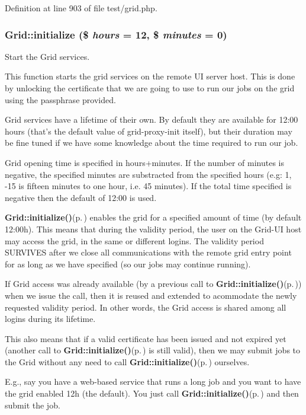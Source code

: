 Definition at line 903 of file test/grid.php.
\subsubsection{\setlength{\rightskip}{0pt plus 5cm}Grid::initialize (\$ {\em hours} = 12, \$ {\em minutes} = 0)}\label{classGrid_a11}


Start the Grid services. 

This function starts the grid services on the remote UI server host. This is done by unlocking the certificate that we are going to use to run our jobs on the grid using the passphrase provided.

Grid services have a lifetime of their own. By default they are available for 12:00 hours (that's the default value of grid-proxy-init itself), but their duration may be fine tuned if we have some knowledge about the time required to run our job.

Grid opening time is specified in hours+minutes. If the number of minutes is negative, the specified minutes are substracted from the specified hours (e.g: 1, -15 is fifteen minutes to one hour, i.e. 45 minutes). If the total time specified is negative then the default of 12:00 is used.

{\bf Grid::initialize()}{\rm (p.\,\pageref{classGrid_a11})} enables the grid for a specified amount of time (by default 12:00h). This means that during the validity period, the user on the Grid-UI host may access the grid, in the same or different logins. The validity period SURVIVES after we close all communications with the remote grid entry point for as long as we have specified (so our jobs may continue running).

If Grid access was already available (by a previous call to {\bf Grid::initialize()}{\rm (p.\,\pageref{classGrid_a11})}) when we issue the call, then it is reused and extended to acommodate the newly requested validity period. In other words, the Grid access is shared among all logins during its lifetime.

This also means that if a valid certificate has been issued and not expired yet (another call to {\bf Grid::initialize()}{\rm (p.\,\pageref{classGrid_a11})} is still valid), then we may submit jobs to the Grid without any need to call {\bf Grid::initialize()}{\rm (p.\,\pageref{classGrid_a11})} ourselves.

E.g., say you have a web-based service that runs a long job and you want to have the grid enabled 12h (the default). You just call {\bf Grid::initialize()}{\rm (p.\,\pageref{classGrid_a11})} and then submit the job.

